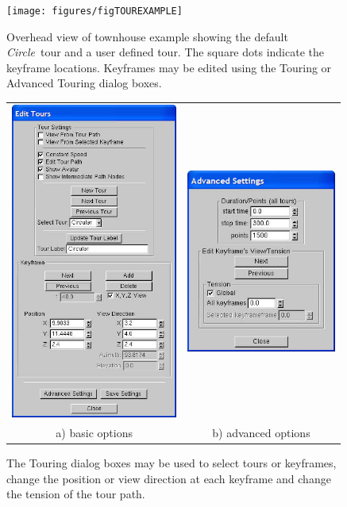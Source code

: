 \documentclass[11pt,twoside]{book}
\newcommand{\figoptions}{hbp}
\begin{document}
\begin{figure}[\figoptions]
\begin{center}
\texttt{[image: figures/figTOUREXAMPLE]}\\
\end{center}
\caption[Overhead view of the townhouse example showing the
default {\em Circle}\ tour and a user defined tour.]{Overhead view of
townhouse example showing the default {\em Circle}\ tour and a user
defined tour.  The square dots indicate the keyframe locations.
Keyframes may be edited using the Touring or Advanced Touring
dialog boxes.}
 \label{figTOUREXAMPLE}
\end{figure}

\begin{figure}[\figoptions]
\begin{center}
\begin{tabular}{cc}
\includegraphics[width=2.159722in]{figures/figTOUR}&
\includegraphics[width=1.93055in]{figures/figADVANCEDTOUR}\\
a) basic options&b) advanced options\\
\end{tabular}
\end{center}
\caption[Touring dialog boxes.]{The Touring dialog boxes may be
used to select tours or keyframes, change the position or view
direction at each keyframe and change the tension of the tour
path. }
 \label{figTOUR}
\end{figure}
\end{document}
